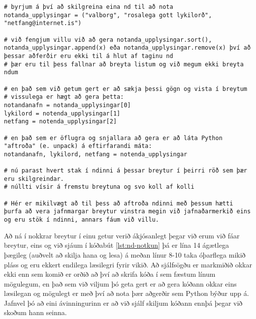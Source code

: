 \begin{lstlisting}[caption=Ndir notaðar, label=lst:nd-notkun]
# byrjum á því að skilgreina eina nd til að nota
notanda_upplysingar = ("valborg", "rosalega gott lykilorð", "netfang@internet.is")

# við fengjum villu við að gera notanda_upplysingar.sort(), notanda_upplysingar.append(x) eða notanda_upplysingar.remove(x) því að þessar aðferðir eru ekki til á hlut af taginu nd
# þær eru til þess fallnar að breyta listum og við megum ekki breyta ndum

# en það sem við getum gert er að sækja þessi gögn og vista í breytum
# vissulega er hægt að gera þetta:
notandanafn = notanda_upplysingar[0]
lykilord = notenda_upplysingar[1]
netfang = notenda_upplysingar[2]

# en það sem er öflugra og snjallara að gera er að láta Python "aftroða" (e. unpack) á eftirfarandi máta:
notandanafn, lykilord, netfang = notenda_upplysingar

# nú parast hvert stak í ndinni á þessar breytur í þeirri röð sem þær eru skilgreindar.
# núllti vísir á fremstu breytuna og svo koll af kolli

# Hér er mikilvægt að til þess að aftroða ndinni með þessum hætti þurfa að vera jafnmargar breytur vinstra megin við jafnaðarmerkið eins og eru stök í ndinni, annars fáum við villu. 

\end{lstlisting}

Að ná í nokkrar breytur í einu getur verið ákjósanlegt þegar við erum við fáar breytur, eins og við sjáum í kóðabút \ref{lst:nd-notkun} þá er lína 14 ágætlega þægileg (auðvelt að skilja hana og lesa) á meðan línur 8-10 taka óþarflega mikið pláss og eru ekkert endilega læsilegri fyrir vikið.
Að sjálfsögðu er markmiðið okkar ekki enn sem komið er orðið að því að skrifa kóða í sem fæstum línum mögulegum, en það sem við viljum þó geta gert er að gera kóðann okkar eins læsilegan og mögulegt er með því að nota þær aðgerðir sem Python býður upp á.
Jafnvel þó að eini ávinningurinn er að við sjálf skiljum kóðann ennþá þegar við skoðum hann seinna.